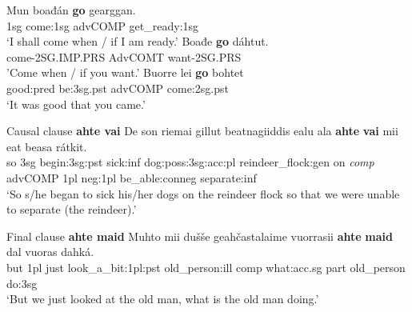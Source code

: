 \documentclass[a4,12pt]{scrartcl}
\begin{document}
\begin{exe}
\ex \label{goTemporal}
\begin{xlist}
\ex %
\cite[196]{nickel1994}
\gll 	Mun 	boađán 	{\bf go} 	gearggan.\\
	{\sc 1sg} come:{\sc 1sg} {\sc advCOMP} get\_ready:{\sc 1sg}\\
\glt 	‘I shall come when / if I am ready.’%
%
\ex \label{goContextDisambig} \cite[196–7]{nickel1994}
\gll Boađe {\bf go} dáhtut.\\ %
come-2SG.IMP.PRS AdvCOMT want-2SG.PRS\\
\glt 'Come when / if you want.'
%
\ex %
\cite[436]{nickel1994}%
\gll 	Buorre 	lei 	{\bf go} 	bohtet\\
	good:{\sc pred} be:{\sc 3sg.pst} {\sc advCOMP} come:{\sc 2sg.pst}\\
\glt 	‘It was good that you came.’
\end{xlist}
	
	

	\ex \label{ahteVai} Causal clause \textbf{ahte vai} \cite[196]{nickel1994}
	\gll 	De 	son 	riemai 	gillut 	beatnagiiddis 	ealu 	ala 	{\bf ahte} {\bf vai} 	mii 	eat 	beasa 	rátkit.\\
	so {\sc 3sg} begin:{\sc 3sg:pst} sick:{\sc inf} dog:{\sc poss:3sg:acc:pl} reindeer\_flock:{\sc gen} on {\it comp} {\sc advCOMP} {\sc 1pl} {\sc neg:1pl} be\_able:{\sc conneg} separate:{\sc inf}\\
	\glt ‘So s/he began to sick his/her dogs on the reindeer flock so that we were unable to separate (the reindeer).’

	\ex \label{ahteMaid} Final clause \textbf{ahte maid} \cite[196]{nickel1994}
	\gll 	Muhto 	mii 	dušše 	geahčastalaime 	vuorrasii 	{\bf ahte} {\bf maid} 	dal 	vuoras 	dahká.\\
	but {\sc 1pl} just look\_a\_bit:{\sc 1pl:pst} old\_person:{\sc ill} {\sc comp} what:{\sc acc.sg} {\sc part} old\_person do:{\sc 3sg}\\
	\glt 	‘But we just looked at the old man, what is the old man doing.'%

\end{exe}
\end{document}
